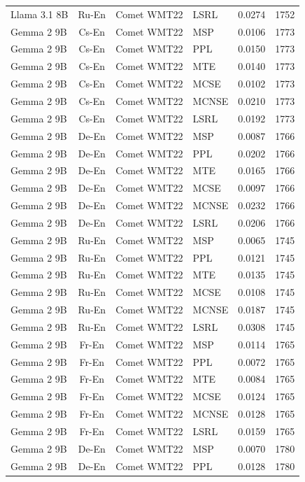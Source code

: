 \begin{table}
\begin{tabular}{lc}
Llama 3.1 8B & Ru-En & Comet WMT22 & LSRL & 0.0274 & 1752 \\
Gemma 2 9B & Cs-En & Comet WMT22 & MSP & 0.0106 & 1773 \\
Gemma 2 9B & Cs-En & Comet WMT22 & PPL & 0.0150 & 1773 \\
Gemma 2 9B & Cs-En & Comet WMT22 & MTE & 0.0140 & 1773 \\
Gemma 2 9B & Cs-En & Comet WMT22 & MCSE & 0.0102 & 1773 \\
Gemma 2 9B & Cs-En & Comet WMT22 & MCNSE & 0.0210 & 1773 \\
Gemma 2 9B & Cs-En & Comet WMT22 & LSRL & 0.0192 & 1773 \\
Gemma 2 9B & De-En & Comet WMT22 & MSP & 0.0087 & 1766 \\
Gemma 2 9B & De-En & Comet WMT22 & PPL & 0.0202 & 1766 \\
Gemma 2 9B & De-En & Comet WMT22 & MTE & 0.0165 & 1766 \\
Gemma 2 9B & De-En & Comet WMT22 & MCSE & 0.0097 & 1766 \\
Gemma 2 9B & De-En & Comet WMT22 & MCNSE & 0.0232 & 1766 \\
Gemma 2 9B & De-En & Comet WMT22 & LSRL & 0.0206 & 1766 \\
Gemma 2 9B & Ru-En & Comet WMT22 & MSP & 0.0065 & 1745 \\
Gemma 2 9B & Ru-En & Comet WMT22 & PPL & 0.0121 & 1745 \\
Gemma 2 9B & Ru-En & Comet WMT22 & MTE & 0.0135 & 1745 \\
Gemma 2 9B & Ru-En & Comet WMT22 & MCSE & 0.0108 & 1745 \\
Gemma 2 9B & Ru-En & Comet WMT22 & MCNSE & 0.0187 & 1745 \\
Gemma 2 9B & Ru-En & Comet WMT22 & LSRL & 0.0308 & 1745 \\
Gemma 2 9B & Fr-En & Comet WMT22 & MSP & 0.0114 & 1765 \\
Gemma 2 9B & Fr-En & Comet WMT22 & PPL & 0.0072 & 1765 \\
Gemma 2 9B & Fr-En & Comet WMT22 & MTE & 0.0084 & 1765 \\
Gemma 2 9B & Fr-En & Comet WMT22 & MCSE & 0.0124 & 1765 \\
Gemma 2 9B & Fr-En & Comet WMT22 & MCNSE & 0.0128 & 1765 \\
Gemma 2 9B & Fr-En & Comet WMT22 & LSRL & 0.0159 & 1765 \\
Gemma 2 9B & De-En & Comet WMT22 & MSP & 0.0070 & 1780 \\
Gemma 2 9B & De-En & Comet WMT22 & PPL & 0.0128 & 1780 \\

\end{tabular}
\end{table}
